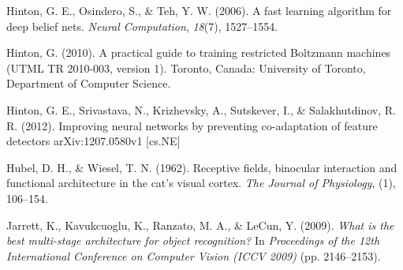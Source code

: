\documentclass{article} %
\begin{document}
\begin{thebibliography}{100}

Hinton, G. E., Osindero, S., \& Teh, Y. W. (2006). 
\newblock A fast learning algorithm for deep belief nets. 
\newblock \emph{Neural Computation}, \emph{18}(7), 1527--1554.

Hinton, G. (2010).
\newblock A practical guide to training restricted Boltzmann machines (UTML TR 2010-003, version 1).
\newblock Toronto, Canada: University of Toronto, Department of Computer Science.

Hinton, G. E., Srivastava, N., Krizhevsky, A., Sutskever, I., \& Salakhutdinov, R. R. (2012). 
\newblock Improving neural networks by preventing co-adaptation of feature detectors
\newblock arXiv:1207.0580v1  [cs.NE]

Hubel, D. H., \& Wiesel, T. N. (1962). 
\newblock Receptive fields, binocular interaction and functional architecture in the cat's visual cortex. 
\newblock \emph{The Journal of Physiology}, (1), 106--154.



Jarrett, K., Kavukcuoglu, K., Ranzato, M. A., \& LeCun, Y. (2009). 
\newblock \emph{What is the best multi-stage architecture for object recognition?} 
\newblock In \emph{Proceedings of the 12th International Conference on Computer Vision (ICCV 2009)} (pp. 2146--2153). %


\end{thebibliography}
\end{document}
